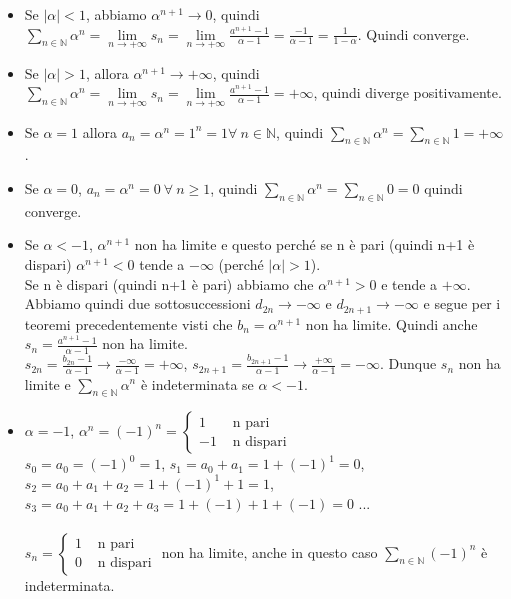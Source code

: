 \begin{itemize}
    \item Se $|\alpha| < 1$, abbiamo $\alpha^{n+1}\to 0$, quindi $\sum_{n\in \mathbb{N}}\alpha^n = \lim\limits_{n\to +\infty}s_n = \lim\limits_{n\to +\infty}\frac{a^{n+1}-1}{\alpha - 1} = \frac{-1}{\alpha - 1} = \frac{1}{1 - \alpha}$. Quindi converge.
    \item Se $|\alpha| > 1$, allora $\alpha^{n+1}\to +\infty$, quindi $\sum_{n\in \mathbb{N}}\alpha^n = \lim\limits_{n\to +\infty}s_n = \lim\limits_{n\to +\infty}\frac{a^{n+1}-1}{\alpha - 1} = +\infty$, quindi diverge positivamente.
    \item Se $\alpha = 1$ allora $a_n = \alpha^n = 1^n = 1 \forall \: n \in \mathbb{N}$, quindi $\sum_{n\in \mathbb{N}}\alpha^n = \sum_{n\in \mathbb{N}}1 = +\infty$.
    \item Se $\alpha = 0$, $a_n = \alpha^n = 0 \: \forall \: n \geq 1$, quindi $\sum_{n\in \mathbb{N}}\alpha^n = \sum_{n\in \mathbb{N}}0 = 0$ quindi converge.
    \item Se $\alpha < -1$, $\alpha^{n+1}$ non ha limite e questo perché se n è pari (quindi n+1 è dispari) $\alpha^{n+1} < 0$ tende a $-\infty$ (perché $|\alpha| >1$).\\
    Se n è dispari (quindi n+1 è pari) abbiamo che $\alpha^{n+1} > 0$ e tende a $+\infty$. Abbiamo quindi due sottosuccessioni $d_{2n} \to -\infty$ e $d_{2n+1}\to -\infty$ e segue per i teoremi precedentemente visti che $b_n = \alpha^{n+1}$ non ha limite. Quindi anche $s_n = \frac{a^{n+1}-1}{\alpha - 1}$ non ha limite. \\
    $s_{2n} = \frac{b_{2n} - 1}{\alpha - 1} \to \frac{-\infty}{\alpha - 1} = +\infty$, $s_{2n+1} = \frac{b_{2n+1} - 1}{\alpha - 1} \to \frac{+\infty}{\alpha - 1} = -\infty$. Dunque $s_n$ non ha limite e $\sum_{n\in \mathbb{N}}\alpha^n$ è indeterminata se $\alpha < -1$.
    \item $\alpha = -1$, $\alpha^n = (-1)^n = \begin{cases}1 & \text{ n pari}\\ -1 & \text{ n dispari}\end{cases}$\\
    $s_0 = a_0 = (-1)^0 = 1$, $s_1 = a_0 + a_1 = 1 + (-1)^1 = 0$, $s_2 = a_0 + a_1 + a_2 = 1 + (-1)^1 + 1 = 1$, $s_3 = a_0 + a_1 + a_2 + a_3 = 1 + (-1) + 1 + (-1) = 0$ ...\\\\
    $s_n = \begin{cases}1 & \text{ n pari}\\ 0 & \text{ n dispari}\end{cases}$ non ha limite, anche in questo caso $\sum_{n\in \mathbb{N}}(-1)^n$ è indeterminata.
\end{itemize}
